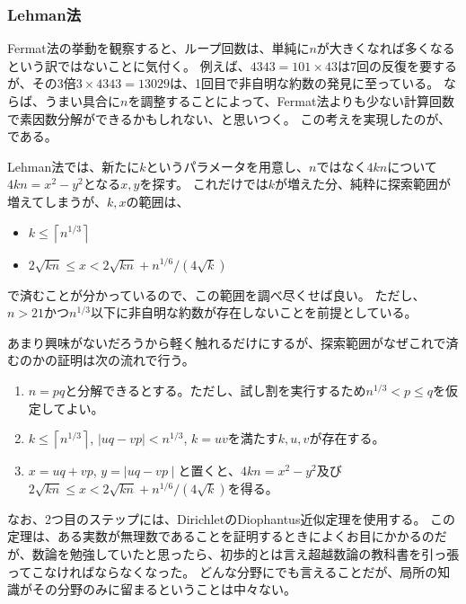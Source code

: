 
\subsubsection{Lehman法}
Fermat法の挙動を観察すると、ループ回数は、単純に$n$が大きくなれば多くなるという訳ではないことに気付く。
例えば、$4343=101\times43$は7回の反復を要するが、その3倍$3\times4343=13029$は、1回目で非自明な約数の発見に至っている。
ならば、うまい具合に$n$を調整することによって、Fermat法よりも少ない計算回数で素因数分解ができるかもしれない、と思いつく。
この考えを実現したのが、である。

Lehman法では、新たに$k$というパラメータを用意し、$n$ではなく$4kn$について$4kn=x^2-y^2$となる$x,y$を探す。
これだけでは$k$が増えた分、純粋に探索範囲が増えてしまうが、$k,x$の範囲は、
\begin{itemize}
\item $k \le \left \lceil n^{1/3}\right \rceil$
\item $2\sqrt{kn}\le x < 2\sqrt{kn}+n^{1/6}/(4\sqrt{k})$
\end{itemize}
で済むことが分かっているので、この範囲を調べ尽くせば良い。
ただし、$n>21$かつ$n^{1/3}$以下に非自明な約数が存在しないことを前提としている。


あまり興味がないだろうから軽く触れるだけにするが、探索範囲がなぜこれで済むのかの証明は次の流れで行う。
\begin{enumerate}
 \item $n=pq$と分解できるとする。ただし、試し割を実行するため$n^{1/3}<p\le q$を仮定してよい。
 \item $k \le \left \lceil n^{1/3}\right \rceil$, $\mid uq - vp \mid < n^{1/3}$, $k = uv$を満たす$k, u, v$が存在する。
 \item $x = uq + vp$, $y = \mid uq - vp \mid$と置くと、$4kn=x^2-y^2$及び$2\sqrt{kn}\le x < 2\sqrt{kn}+n^{1/6}/(4\sqrt{k})$を得る。
\end{enumerate}

なお、2つ目のステップには、DirichletのDiophantus近似定理を使用する。
この定理は、ある実数が無理数であることを証明するときによくお目にかかるのだが、数論を勉強していたと思ったら、初歩的とは言え超越数論の教科書を引っ張ってこなければならなくなった。
どんな分野にでも言えることだが、局所の知識がその分野のみに留まるということは中々ない。

